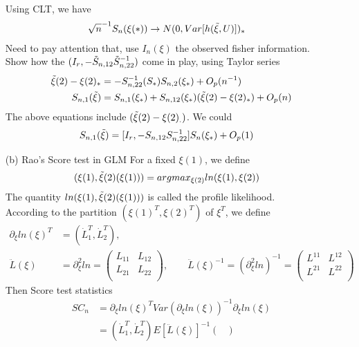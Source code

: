 \documentclass{article}
\begin{document}
\begin{itemize}
Using CLT, we have 
\begin{align*}
\sqrt{n}^{-1} S_n(\xi(\ast))  & \rightarrow N(0, Var[h(\Tilde{\xi}, U)])_{\ast} 
\end{align*} 
Need to pay attention that, use $I_n(\xi)$ the observed fisher information.\\
Show how the $(I_r, -\Tilde{S}_{n,12}\Tilde{S}^{-1}_{n,22})$ come in play, using Taylor series
\begin{align*}
\Tilde{\xi}(2) - \xi(2)_{\ast} &= - S_{n,22}^{-1}(S_{\ast}) S_{n,2}(\xi_{\ast}) + O_p(n^{-1})\\
 S_{n,1}(\Tilde{\xi}) &= S_{n,1}(\xi_{\ast}) + S_{n,12}(\xi_{\ast}) (\Tilde{\xi}(2) -\xi(2)_{\ast}) + O_p(n) 
\end{align*} 
The above equations include $(\Tilde{\xi}(2) -\xi(2)_{.})$. We could 
\begin{align*}
 S_{n,1}(\Tilde{\xi}) &= [I_r, - S_{n,12} S_{n,22}^{-1}] S_{n}(\xi_{\ast}) + O_p(1)
\end{align*} 
\item[(b)] Rao's Score test in GLM
For a fixed $\xi(1)$, we define 
\begin{align*}
 (\xi(1), \Tilde{\xi}(2)(\xi(1))) &= argmax_{\xi{(2)}} ln(\xi{(1)}, \xi(2))
\end{align*} 
The quantity $ln(\xi{(1)},  \Tilde{\xi}(2)(\xi(1)))$ is called the profile likelihood. \\
According to the partition $(\xi{(1)}^T, \xi(2)^T)$ of $\xi^T$, we define
\begin{align*}
 \partial_{\xi}ln(\xi)^T &= (\dot{L}_1^T, \dot{L}_2^T),\\
 \ddot{L}(\xi) &= \partial_{\xi}^2 ln = \begin{pmatrix}
            L_{11} & L_{12}\\
           L_{21} & L_{22}\\
         \end{pmatrix} , \qquad \ddot{L}(\xi)^{-1} = (\partial_{\xi}^2 ln)^{-1} =\begin{pmatrix}
            L^{11} & L^{12}\\
           L^{21} & L^{22}\\
         \end{pmatrix} 
\end{align*} 
Then Score test statistics
\begin{align*}
 SC_n &= \partial_{\xi}ln(\xi)^T Var \left(\partial_{\xi}ln(\xi) \right)^{-1} \partial_{\xi}ln(\xi)\\
 &= (\dot{L}_1^T, \dot{L}_2^T) E \left[ \ddot{L}(\xi)\right]^{-1}  \begin{pmatrix}

\end{pmatrix}
\end{align*}
\end{itemize}
\end{document}
